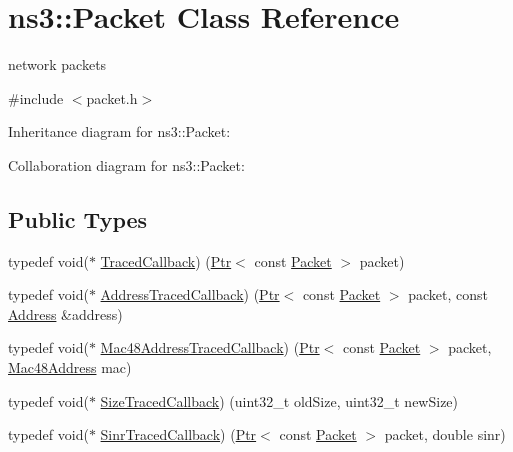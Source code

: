 \hypertarget{classns3_1_1Packet}{}\section{ns3\+:\+:Packet Class Reference}
\label{classns3_1_1Packet}


network packets  




{\ttfamily \#include $<$packet.\+h$>$}



Inheritance diagram for ns3\+:\+:Packet\+:


Collaboration diagram for ns3\+:\+:Packet\+:
\subsection*{Public Types}
\begin{DoxyCompactItemize}
\item 
typedef void($\ast$ \hyperlink{classns3_1_1Packet_ac142a8ce0c096befb3f37ac21ebe1189}{Traced\+Callback}) (\hyperlink{classns3_1_1Ptr}{Ptr}$<$ const \hyperlink{classns3_1_1Packet}{Packet} $>$ packet)
\item 
typedef void($\ast$ \hyperlink{classns3_1_1Packet_a42d0785b8ad6baeaa09ac86bd2452bad}{Address\+Traced\+Callback}) (\hyperlink{classns3_1_1Ptr}{Ptr}$<$ const \hyperlink{classns3_1_1Packet}{Packet} $>$ packet, const \hyperlink{classns3_1_1Address}{Address} \&address)
\item 
typedef void($\ast$ \hyperlink{classns3_1_1Packet_ab6f94bff1c9fa352a6d94ae1a431a750}{Mac48\+Address\+Traced\+Callback}) (\hyperlink{classns3_1_1Ptr}{Ptr}$<$ const \hyperlink{classns3_1_1Packet}{Packet} $>$ packet, \hyperlink{classns3_1_1Mac48Address}{Mac48\+Address} mac)
\item 
typedef void($\ast$ \hyperlink{classns3_1_1Packet_ae4825786a08d3d0b6d376ac5961b8328}{Size\+Traced\+Callback}) (uint32\+\_\+t old\+Size, uint32\+\_\+t new\+Size)
\item 
typedef void($\ast$ \hyperlink{classns3_1_1Packet_ab8a596ff094dbac36dec56e566f9208d}{Sinr\+Traced\+Callback}) (\hyperlink{classns3_1_1Ptr}{Ptr}$<$ const \hyperlink{classns3_1_1Packet}{Packet} $>$ packet, double sinr)
\end{DoxyCompactItemize}
